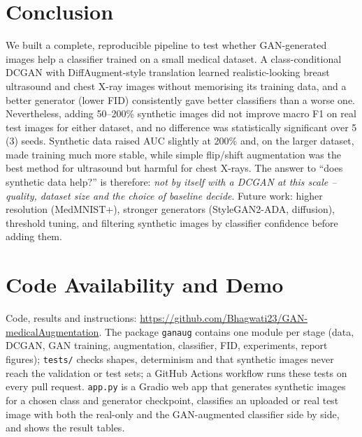 \section{Conclusion}
We built a complete, reproducible pipeline to test whether GAN-generated images help a classifier trained on a small
medical dataset. A class-conditional DCGAN with DiffAugment-style translation learned realistic-looking breast ultrasound
and chest X-ray images without memorising its training data, and a better generator (lower FID) consistently gave better
classifiers than a worse one. Nevertheless, adding 50--200\% synthetic images did not improve macro F1 on real test
images for either dataset, and no difference was statistically significant over 5 (3) seeds. Synthetic data raised AUC
slightly at 200\% and, on the larger dataset, made training much more stable, while simple flip/shift augmentation was the
best method for ultrasound but harmful for chest X-rays. The answer to ``does synthetic data help?'' is therefore:
\emph{not by itself with a DCGAN at this scale -- quality, dataset size and the choice of baseline decide}.
Future work: higher resolution (MedMNIST+), stronger generators (StyleGAN2-ADA, diffusion), threshold tuning, and
filtering synthetic images by classifier confidence before adding them.

\section*{Code Availability and Demo}
Code, results and instructions: \url{https://github.com/Bhagwati23/GAN-medicalAugmentation}. The package \texttt{ganaug}
contains one module per stage (data, DCGAN, GAN training, augmentation, classifier, FID, experiments, report figures);
\texttt{tests/} checks shapes, determinism and that synthetic images never reach the validation or test sets; a GitHub
Actions workflow runs these tests on every pull request. \texttt{app.py} is a Gradio web app that generates synthetic images
for a chosen class and generator checkpoint, classifies an uploaded or real test image with both the real-only and the
GAN-augmented classifier side by side, and shows the result tables.

